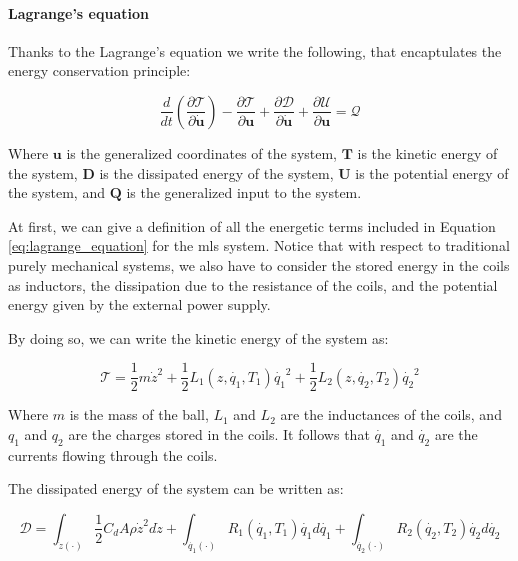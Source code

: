 \paragraph{Lagrange's equation}

Thanks to the Lagrange's equation we write the following, that encaptulates the energy conservation principle:

\begin{equation}
    \frac{d}{dt} \left( \frac{\partial \mathcal{T}}{\partial \dot{\mathbf{u}}} \right) - \frac{\partial \mathcal{T}}{\partial \mathbf{u}} + \frac{\partial \mathcal{D}}{\partial \dot{\mathbf{u}}} + \frac{\partial \mathcal{U}}{\partial \mathbf{u}} = \mathcal{Q}
    \label{eq:lagrange_equation}
\end{equation}

Where $\mathbf{u}$ is the generalized coordinates of the system, $\mathbf{T}$ is the kinetic energy of the system, $\mathbf{D}$ is the dissipated energy of the system, $\mathbf{U}$ is the potential energy of the system, and $\mathbf{Q}$ is the generalized input to the system.

At first, we can give a definition of all the energetic terms included in Equation \ref{eq:lagrange_equation} for the \acrshort{mls} system.
Notice that with respect to traditional purely mechanical systems, we also have to consider the stored energy in the coils as inductors, the dissipation due to the resistance of the coils, and the potential energy given by the external power supply.

By doing so, we can write the kinetic energy of the system as:

\begin{equation}
    \mathcal{T} = \frac{1}{2} m \dot{z}^2 + \frac{1}{2} L_1(z, \dot{q_1}, T_1) \dot{q_1}^2 + \frac{1}{2} L_2(z, \dot{q_2}, T_2) \dot{q_2}^2
    \label{eq:kinetic_energy}
\end{equation}

Where $m$ is the mass of the ball, $L_1$ and $L_2$ are the inductances of the coils, and $q_1$ and $q_2$ are the charges stored in the coils.
It follows that $\dot{q_1}$ and $\dot{q_2}$ are the currents flowing through the coils.

The dissipated energy of the system can be written as:

\begin{equation}
    \mathcal{D} = \int_{\dot{z}(\cdot)} \frac{1}{2} C_d A \rho \dot{z}^2 d\dot{z} + \int_{\dot{q_1}(\cdot)} R_1(\dot{q_1}, T_1) \dot{q_1} d\dot{q_1} + \int_{\dot{q_2}(\cdot)} R_2(\dot{q_2}, T_2) \dot{q_2} d\dot{q_2}
    \label{eq:dissipated_energy}
\end{equation}

